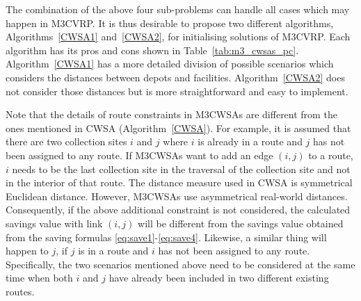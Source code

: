 \documentclass[journal]{IEEEtran}
\begin{document}
The combination of the above four sub-problems can handle all cases which may happen in M3CVRP. It is thus desirable to propose two different algorithms, Algorithms~\ref{CWSA1} and~\ref{CWSA2}, for initialising solutions of M3CVRP. Each algorithm has its pros and cons shown in Table~\ref{tab:m3_cwsas_pc}.
Algorithm~\ref{CWSA1} has a more detailed division of possible scenarios which considers the distances between depots and facilities. Algorithm~\ref{CWSA2} does not consider those distances but is more straightforward and easy to implement.

Note that the details of route constraints in M3CWSAs are different from the ones mentioned in CWSA (Algorithm~\ref{CWSA}). For example, it is assumed that there are two collection sites $i$ and $j$ where $i$ is already in a route and $j$ has not been assigned to any route. If M3CWSAs want to add an edge $(i, j)$ to a route, $i$ needs to be the last collection site in the traversal of the collection site and not in the interior of that route. The distance measure used in CWSA is symmetrical Euclidean distance. However, M3CWSAs use asymmetrical real-world distances. Consequently, if the above additional constraint is not considered, the calculated savings value with link $(i,j)$ will be different from the savings value obtained from the saving formulas \eqref{eq:save1}-\eqref{eq:save4}. Likewise, a similar thing will happen to $j$, if $j$ is in a route and $i$ has not been assigned to any route. Specifically, the two scenarios mentioned above need to be considered at the same time when both $i$ and $j$ have already been included in two different existing routes.
\end{document}
